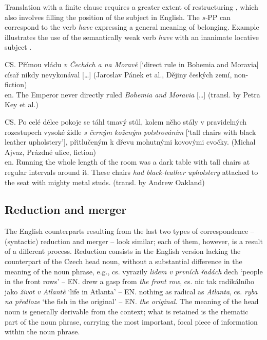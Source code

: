 \documentclass[output=paper]{langscibook}
\begin{document}
Translation with a finite clause requires a greater extent of restructuring , which also involves filling the position of the subject in English. The \textit{s-}PP can correspond to the verb \textit{have} expressing a general meaning of belonging. Example  illustrates the use of the semantically weak verb \textit{have} with an inanimate locative subject \citep{mala_english_2019}.

\ea\label{ex:mala:9}
CS. Přímou vládu \textit{v Čechách a na Moravě} [‘direct rule in Bohemia and Moravia] císař nikdy nevykonával […] (Jaroslav Pánek et al., Dějiny českých zemí, non-fiction)\\
en. The Emperor never directly ruled \textit{Bohemia and Moravia} […] (transl. by Petra Key et al.)
\z

\ea\label{ex:mala:10}
CS. Po celé délce pokoje se táhl tmavý stůl, kolem něho stály v pravidelných rozestupech vysoké židle \textit{s černým koženým polstrováním} [‘tall chairs with black leather upholstery’], přitlučeným k dřevu mohutnými kovovými cvočky. (Michal Ajvaz, Prázdné ulice, fiction) \\
en. Running the whole length of the room was a dark table with tall chairs at regular intervals around it. These chairs \textit{had black-leather upholstery} attached to the seat with mighty metal studs. (transl. by Andrew Oakland)
\z

\subsection{Reduction and merger}

The English counterparts resulting from the last two types of correspondence – (syntactic) reduction and merger – look similar; each of them, however, is a result of a different process. Reduction consists in the English version lacking the counterpart of the Czech head noun, without a substantial difference in the meaning of the noun phrase, e.g., cs. vyrazily \textit{lidem v prvních řadách} dech ‘people in the front rows’ – EN. drew a gasp from \textit{the front row}, cs. nic tak radikálního jako \textit{život v Atlantě} ‘life in Atlanta’ – EN. nothing as radical as \textit{Atlanta}, cs. \textit{ryba na předloze} ‘the fish in the original’ – EN. \textit{the original}. The meaning of the head noun is generally derivable from the context; what is retained is the rhematic part of the noun phrase, carrying the most important, focal piece of information within the noun phrase.
\end{document}
